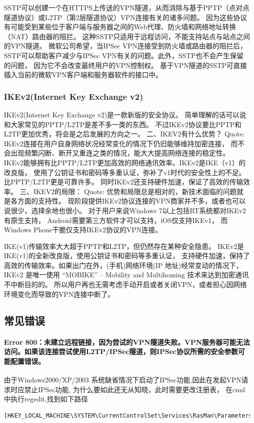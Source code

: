 \documentclass{book}
\begin{document}
SSTP可以创建一个在HTTPS上传送的VPN隧道，从而消除与基于PPTP（点对点隧道协议）或L2TP（第2层隧道协议）VPN连接有关的诸多问题。
因为这些协议有可能受到某些位于客户端与服务器之间的Web代理、防火墙和网络地址转换（NAT）路由器的阻拦。
这种SSTP只适用于远程访问，不能支持站点与站点之间的VPN隧道。
微软公司希望，当IPSec VPN连接受到防火墙或路由器的阻拦后，
SSTP可以帮助客户减少与IPSec VPN有关的问题。此外，SSTP也不会产生保留的问题，
因为它不会改变最终用户的VPN控制权。
基于VPN隧道的SSTP可直接插入当前的微软VPN客户端和服务器软件的接口中。

\subsubsection{IKEv2(Internet Key Exchange v2)}

IKEv2(Internet Key Exchange v2)是一款新版的安全协议。
简单理解的话可以说和大家常见的PPTP/L2TP是差不多一类的东西。
不过IKEv2协议要比PPTP和L2TP更加优秀，将会是之后发展的方向之一。
二、IKEV2有什么优势？
Quote:
IKEv2连接在用户自身网络状况经常变化的情况下仍旧能够维持加密连接，
而不会出现频繁闪断、断开又重连之类的情况，能大大提高网络连接的稳定性。
IKEv2能够拥有比PPTP/L2TP更加高效的网络通讯效率。IKEv2是IKE（v1）的改良版，
使用了公钥证书和密码等多重认证，弥补了v1时代的安全性上的不足。比PPTP/L2TP更是可靠许多。
同时IKEv2还支持硬件加速，保证了高效的传输效率。
三、IKEV2的局限：
Quote:
优势和局限总是相对的，新技术面临的问题就是各方面的支持性。
现阶段提供IKEv2协议连接的VPN商家并不多，或者也可以说很少，选择余地也很小。
对于用户来说Windows 7以上包括RT系统都对IKEv2有原生支持，
Android需要第三方软件才可以支持，iOS仅支持IKEv1，
而Windows Phone干脆仅支持IKEv2协议的VPN连接。

IKE(v1)传输效率大大超于PPTP和L2TP，但仍然存在某种安全隐患。
IKEv2是IKE(v1)的全新改良版，使用公钥证书和密码等多重认证，
支持硬件加速，保持了高效的传输效率。如果出门在外，(手机)网络环境(IP 地址)经常变动的情况下，
IKEv2 是唯一使用 “MOBIKE” – Mobility and Multihoming 技术来达到加密通讯不中断目的的。
所以用户再也无需考虑手动开启或者关闭VPN，或者担心因网络环境变化而导致的VPN连接中断了。

\subsection{常见错误}

\paragraph{Error 800：未建立远程链接，因为尝试的VPN隧道失败。VPN服务器可能无法访问。如果该连接尝试使用L2TP/IPSec隧道，则IPSec协议所需的安全参数可能配置错误。}
由于Windows2000/XP/2003 系统缺省情况下启动了IPSec功能,因此在发起VPN请求时应禁止IPSec功能,
为什么要如此还无从知晓，此时需要更改注册表，
在cmd中执行regedit,找到如下路径
\begin{lstlisting}
[HKEY_LOCAL_MACHINE\SYSTEM\CurrentControlSet\Services\RasMan\Parameters]
\end{lstlisting}
\end{document}
